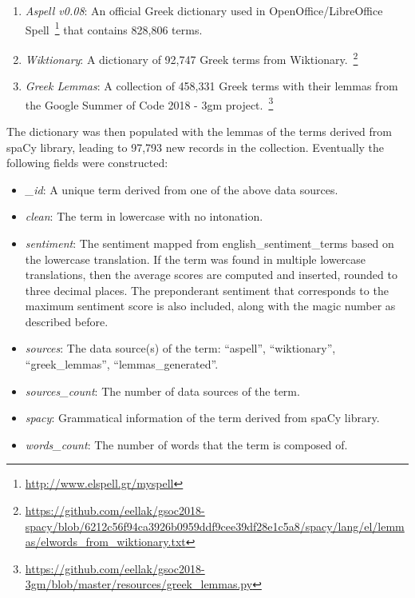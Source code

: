\begin{enumerate}
 \item \emph{Aspell v0.08}: An official Greek dictionary used in OpenOffice/LibreOffice Spell~\footnote{\url {http://www.elspell.gr/myspell}}
 that contains 828,806 terms.
    
 \item \emph{Wiktionary}: A dictionary of 92,747 Greek terms from Wiktionary.~\footnote{\url {https://github.com/eellak/gsoc2018-spacy/blob/6212c56f94ca3926b0959ddf9cee39df28e1c5a8/spacy/lang/el/lemmas/elwords_from_wiktionary.txt}}

 \item \emph{Greek Lemmas}: A collection of 458,331 Greek terms with their lemmas
 from the Google Summer of Code 2018 - 3gm project.~\footnote{\url {https://github.com/eellak/gsoc2018-3gm/blob/master/resources/greek_lemmas.py}}
\end{enumerate}

The dictionary was then populated with the lemmas of the terms
derived from spaCy library, leading to 97,793 new records in the collection.
Eventually the following fields were constructed:

\begin{itemize}
 \item \emph{\_id}: A unique term derived from one of the above data sources.
 
 \item \emph{clean}: The term in lowercase with no intonation.
 
 \item \emph{sentiment}: The sentiment mapped from english\_sentiment\_terms
 based on the lowercase translation.
 If the term was found in multiple lowercase translations,
 then the average scores are computed and inserted,
 rounded to three decimal places.
 The preponderant sentiment that corresponds to the maximum sentiment score
 is also included, along with the magic number as described before.
 
 \item \emph{sources}: The data source(s) of the term:
 ``aspell'', ``wiktionary'', ``greek\_lemmas'', ``lemmas\_generated''.
 
 \item \emph{sources\_count}: The number of data sources of the term.
 
 \item \emph{spacy}: Grammatical information of the term
 derived from spaCy library.
 
 \item \emph{words\_count}: The number of words that the term is composed of.
\end{itemize}

